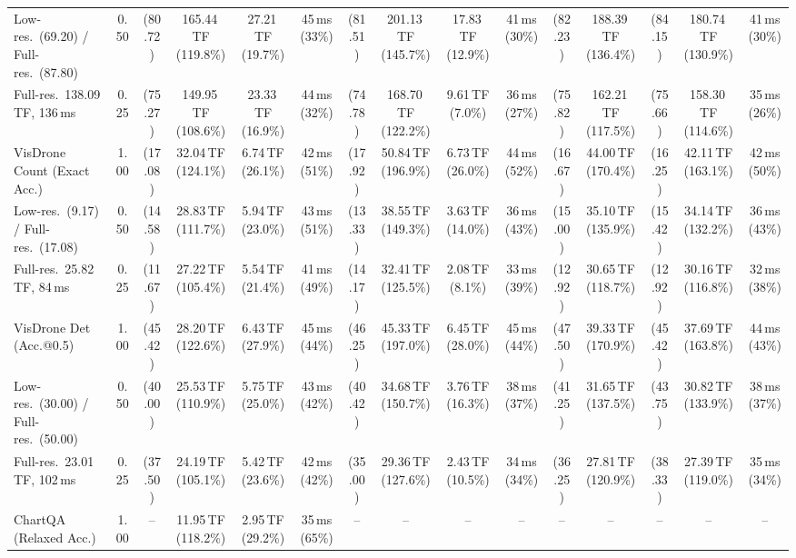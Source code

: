 \begin{table}[t]
{\begin{tabular}{l c | c c c c | c c c c | c c | c c c}
{\footnotesize Low-res.\ (69.20) / Full-res.\ (87.80)} & 0.50 & (80.72) & 165.44\,TF (119.8\%) & 27.21\,TF (19.7\%) & 45\,ms (33\%) & (81.51) & 201.13\,TF (145.7\%) & 17.83\,TF (12.9\%) & 41\,ms (30\%) & (82.23) & 188.39\,TF (136.4\%) & (84.15) & 180.74\,TF (130.9\%) & 41\,ms (30\%) \\
{\footnotesize Full-res.\ 138.09\,TF, 136\,ms} & 0.25 & (75.27) & 149.95\,TF (108.6\%) & 23.33\,TF (16.9\%) & 44\,ms (32\%) & (74.78) & 168.70\,TF (122.2\%) & 9.61\,TF (7.0\%) & 36\,ms (27\%) & (75.82) & 162.21\,TF (117.5\%) & (75.66) & 158.30\,TF (114.6\%) & 35\,ms (26\%) \\
\cmidrule(lr){1-15}
VisDrone Count (Exact Acc.) & 1.00 & (17.08) & 32.04\,TF (124.1\%) & 6.74\,TF (26.1\%) & 42\,ms (51\%) & (17.92) & 50.84\,TF (196.9\%) & 6.73\,TF (26.0\%) & 44\,ms (52\%) & (16.67) & 44.00\,TF (170.4\%) & (16.25) & 42.11\,TF (163.1\%) & 42\,ms (50\%) \\
{\footnotesize Low-res.\ (9.17) / Full-res.\ (17.08)} & 0.50 & (14.58) & 28.83\,TF (111.7\%) & 5.94\,TF (23.0\%) & 43\,ms (51\%) & (13.33) & 38.55\,TF (149.3\%) & 3.63\,TF (14.0\%) & 36\,ms (43\%) & (15.00) & 35.10\,TF (135.9\%) & (15.42) & 34.14\,TF (132.2\%) & 36\,ms (43\%) \\
{\footnotesize Full-res.\ 25.82\,TF, 84\,ms} & 0.25 & (11.67) & 27.22\,TF (105.4\%) & 5.54\,TF (21.4\%) & 41\,ms (49\%) & (14.17) & 32.41\,TF (125.5\%) & 2.08\,TF (8.1\%) & 33\,ms (39\%) & (12.92) & 30.65\,TF (118.7\%) & (12.92) & 30.16\,TF (116.8\%) & 32\,ms (38\%) \\
\cmidrule(lr){1-15}
VisDrone Det (Acc.@0.5) & 1.00 & (45.42) & 28.20\,TF (122.6\%) & 6.43\,TF (27.9\%) & 45\,ms (44\%) & (46.25) & 45.33\,TF (197.0\%) & 6.45\,TF (28.0\%) & 45\,ms (44\%) & (47.50) & 39.33\,TF (170.9\%) & (45.42) & 37.69\,TF (163.8\%) & 44\,ms (43\%) \\
{\footnotesize Low-res.\ (30.00) / Full-res.\ (50.00)} & 0.50 & (40.00) & 25.53\,TF (110.9\%) & 5.75\,TF (25.0\%) & 43\,ms (42\%) & (40.42) & 34.68\,TF (150.7\%) & 3.76\,TF (16.3\%) & 38\,ms (37\%) & (41.25) & 31.65\,TF (137.5\%) & (43.75) & 30.82\,TF (133.9\%) & 38\,ms (37\%) \\
{\footnotesize Full-res.\ 23.01\,TF, 102\,ms} & 0.25 & (37.50) & 24.19\,TF (105.1\%) & 5.42\,TF (23.6\%) & 42\,ms (42\%) & (35.00) & 29.36\,TF (127.6\%) & 2.43\,TF (10.5\%) & 34\,ms (34\%) & (36.25) & 27.81\,TF (120.9\%) & (38.33) & 27.39\,TF (119.0\%) & 35\,ms (34\%) \\
\cmidrule(lr){1-15}
ChartQA (Relaxed Acc.) & 1.00 & -- & 11.95\,TF (118.2\%) & 2.95\,TF (29.2\%) & 35\,ms (65\%) & -- & -- & -- & -- & -- & -- & -- & -- & -- \\

\end{tabular}}
\end{table}
